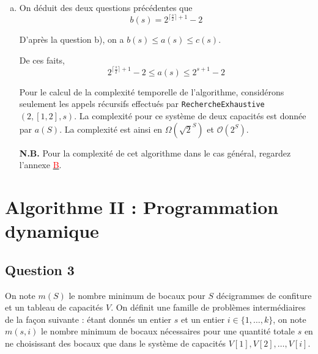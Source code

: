 \documentclass[12pt,a4paper]{article}
\begin{document}
\begin{enumerate}[a)]
De ce fait, $P_{4}(s)$ est vraie.

\medskip
\underline{Conclusion} : 
\begin{equation*}
\left .\begin{array}{l}
P_{4}(0) \text{ et } P_{4}(1) \text{ vraies } \\
\forall s \geq 2, [(P_{4}(s-2) \text{ et } P_{4}(s-1)) \Rightarrow P_{4}(s) ]
\end{array} \right \}
\left .\begin{array}{l}
\forall s \in \mathbb{N}, b(s) = c(\lceil \frac{s}{2}\rceil)
\end{array}\right .
\end{equation*}

\item On d\'eduit des deux questions pr\'ec\'edentes que 
\begin{equation*}
 b(s) = 2^{\lceil \frac{s}{2} \rceil + 1} - 2
\end{equation*}


D'apr\`es la question b), on a $ b(s) \leq a(s) \leq c(s) $. 

De ces faits, 
\begin{equation*}
 2^{\lceil \frac{s}{2} \rceil + 1} - 2 \leq a(s) \leq 2^{s+1} - 2
\end{equation*}


Pour le calcul de la complexit\'e temporelle de l'algorithme, consid\'erons seulement les appels r\'ecursifs effectu\'es par \texttt{RechercheExhaustive}$(2,[1,2],s)$.
La complexit\'e pour ce syst\`eme de deux capacit\'es est donn\'ee par $a(S)$. La complexit\'e est ainsi en $\Omega\left(\sqrt{2}^S\right)$ et $\mathcal{O}(2^S)$.

{\bfseries N.B.} Pour la complexit\'e de cet algorithme dans le cas g\'en\'eral, regardez l'annexe \hyperref[appendix:rech_gen]{\textcolor{red}{B}}.

\end{enumerate}

\newpage
\section{Algorithme II : Programmation dynamique}

\subsection*{Question 3}
On note $m(S)$ le nombre minimum de bocaux pour $S$ d\'ecigrammes de confiture et un tableau de capacit\'es $V$. On d\'efinit une famille de probl\`emes interm\'ediaires de la fa\c{c}on suivante : \'etant donn\'es un entier $s$ et un entier $i \in \{1, \dotsc, k\}$, on note $m(s,i)$ le nombre minimum de bocaux n\'ecessaires pour une quantit\'e totale $s$ en ne choisissant des bocaux que dans le syst\`eme de capacit\'es $V[1],V[2],\dotsc,V[i]$.
\end{document}

